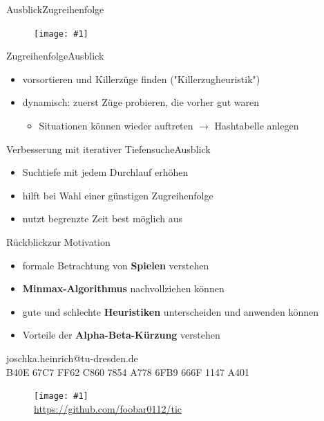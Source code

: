 \documentclass[18pt, aspectratio=169]{beamer}
\newcommand\g[3]{%
  \begin{figure}[!ht]
  \centering
  \texttt{[image: \#1]}
  {\small#3}
  \end{figure}}
\begin{document}

\begin{frame}{Ausblick}{Zugreihenfolge}
  \g{a/agenda_diagram_Ausblick.pdf}{0.5}{}
\end{frame}

\begin{frame}{Zugreihenfolge}{Ausblick}
  \begin{itemize}
  \item
    vorsortieren und Killerzüge finden ("Killerzugheuristik")
  \item
    dynamisch: zuerst Züge probieren, die vorher gut waren
    \begin{itemize}
    \item
      Situationen können wieder auftreten $\rightarrow$ Hashtabelle anlegen
    \end{itemize}
  \end{itemize}
\end{frame}


\begin{frame}{Verbesserung mit iterativer Tiefensuche}{Ausblick}
  \begin{itemize}
  	\item Suchtiefe mit jedem Durchlauf erhöhen
  	\pause
  \item
    hilft bei Wahl einer günstigen Zugreihenfolge
  \item
    nutzt begrenzte Zeit best möglich aus
  \end{itemize}
\end{frame}

\begin{frame}{Rückblick}{zur Motivation}
  \begin{itemize}
		\item
		  formale Betrachtung von \textbf{Spielen} verstehen
		\item
		  \textbf{Minmax-Algorithmus} nachvollziehen können
  	\item
		  gute und schlechte \textbf{Heuristiken} unterscheiden und anwenden können
		\item
		  Vorteile der \textbf{Alpha-Beta-Kürzung} verstehen
	\end{itemize}
\end{frame}



\begin{frame}{}{}
  \begin{center}
  joschka.heinrich@tu-dresden.de\\

  \vspace{\baselineskip}
  B40E 67C7 FF62 C860 7854 A778 6FB9 666F 1147 A401\\
  \vspace{\baselineskip}

  \g{img/github.png}{0.2}{\\\url{https://github.com/foobar0112/tic}}
  \end{center}
\end{frame}
\end{document}
